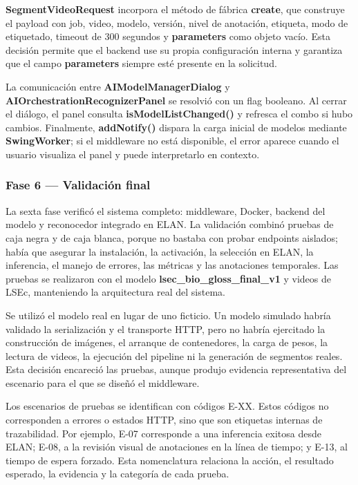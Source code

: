 \documentclass[11pt,a4paper]{article}
\begin{document}
\textbf{SegmentVideoRequest} incorpora el método de fábrica \textbf{create}, que construye el payload con job, video, modelo, versión, nivel de anotación, etiqueta, modo de etiquetado, timeout de 300 segundos y \textbf{parameters} como objeto vacío. Esta decisión permite que el backend use su propia configuración interna y garantiza que el campo \textbf{parameters} siempre esté presente en la solicitud.

La comunicación entre \textbf{AIModel\allowbreak{}ManagerDialog} y \textbf{AIOrchestration\allowbreak{}RecognizerPanel} se resolvió con un flag booleano. Al cerrar el diálogo, el panel consulta \textbf{isModelListChanged()} y refresca el combo si hubo cambios. Finalmente, \textbf{addNotify()} dispara la carga inicial de modelos mediante \textbf{SwingWorker}; si el middleware no está disponible, el error aparece cuando el usuario visualiza el panel y puede interpretarlo en contexto.

\subsubsection{Fase 6 — Validación final}

La sexta fase verificó el sistema completo: middleware, Docker, backend del modelo y reconocedor integrado en ELAN. La validación combinó pruebas de caja negra y de caja blanca, porque no bastaba con probar endpoints aislados; había que asegurar la instalación, la activación, la selección en ELAN, la inferencia, el manejo de errores, las métricas y las anotaciones temporales. Las pruebas se realizaron con el modelo \textbf{lsec\_bio\_gloss\_final\_v1} y videos de LSEc, manteniendo la arquitectura real del sistema.

Se utilizó el modelo real en lugar de uno ficticio. Un modelo simulado habría validado la serialización y el transporte HTTP, pero no habría ejercitado la construcción de imágenes, el arranque de contenedores, la carga de pesos, la lectura de videos, la ejecución del pipeline ni la generación de segmentos reales. Esta decisión encareció las pruebas, aunque produjo evidencia representativa del escenario para el que se diseñó el middleware.

Los escenarios de pruebas se identifican con códigos E-XX. Estos códigos no corresponden a errores o estados HTTP, sino que son etiquetas internas de trazabilidad. Por ejemplo, E-07 corresponde a una inferencia exitosa desde ELAN; E-08, a la revisión visual de anotaciones en la línea de tiempo; y E-13, al tiempo de espera forzado. Esta nomenclatura relaciona la acción, el resultado esperado, la evidencia y la categoría de cada prueba.
\end{document}
